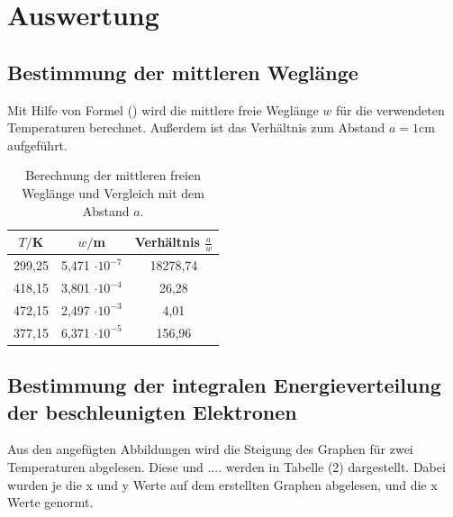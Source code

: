 
\section{Auswertung}
\label{sec:Auswertung}

\subsection{Bestimmung der mittleren Weglänge}
Mit Hilfe von Formel () wird die mittlere freie Weglänge $w$ für die verwendeten Temperaturen berechnet. Außerdem ist das Verhältnis zum Abstand $a = 1 \si{\cm}$ aufgeführt.
\begin{table}[H]
  \centering
  \caption{Berechnung der mittleren freien Weglänge und Vergleich mit dem Abstand $a$.}
  \label{tab:Parameter}
  \begin{tabular}{c c c}
    \toprule
    $T/$K& $w/$m  & Verhältnis $\frac{a}{w}$ \\
    \bottomrule
    299,25 & 5,471 $\cdot 10^{-7}$ & 18278,74 \\
    418,15 & 3,801 $\cdot 10^{-4}$ & 26,28\\
    472,15 & 2,497 $\cdot 10^{-3}$ & 4,01\\
    377,15 & 6,371 $\cdot 10^{-5}$ & 156,96\\
     \bottomrule
  \end{tabular}
\end{table}


\subsection{Bestimmung der integralen Energieverteilung der beschleunigten Elektronen}

Aus den angefügten Abbildungen wird die Steigung des Graphen für zwei Temperaturen abgelesen. Diese und .... werden in Tabelle (2) dargestellt.
Dabei wurden je die x und y Werte auf dem erstellten Graphen abgelesen, und die x Werte genormt.

